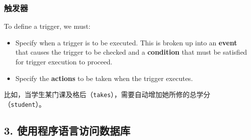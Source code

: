 \documentclass[aspectratio=169, 14pt]{beamer}
\begin{document}
\begin{frame}
    \frametitle{触发器}
To define a trigger, we must:

\begin{itemize}
    \item Specify when a trigger is to be executed. This is broken up into an \textbf{event} that causes the trigger to be checked and a \textbf{condition} that must be satisfied for trigger execution to proceed.
    \item Specify the \textbf{actions} to be taken when the trigger executes.
\end{itemize}

 比如，当学生某门课及格后（\texttt{takes}），需要自动增加她所修的总学分（\texttt{student}）。
\end{frame}

\begin{frame}[fragile]
    \section{\textcolor{darkmidnightblue}{3. 使用程序语言访问数据库}}
{\Huge {}   }
{\Huge {}}

{\Huge {}}
\end{frame}
\end{document}

